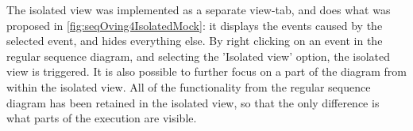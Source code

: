 The isolated view was implemented as a separate view-tab, and does what was proposed in \autoref{fig:seqOving4IsolatedMock}: it displays the events caused by the selected event, and hides everything else.
By right clicking on an event in the regular sequence diagram, and selecting the 'Isolated view' option, the isolated view is triggered.%
It is also possible to further focus on a part of the diagram from within the isolated view.
All of the functionality from the regular sequence diagram has been retained in the isolated view, so that the only difference is what parts of the execution are visible.
~\\
 
